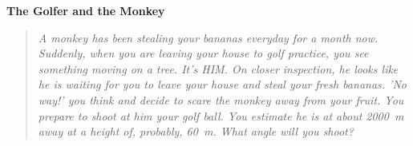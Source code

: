 \documentclass[12pt,letterpaper]{article}
\begin{document}
\begin{center}
    \Large{\textbf{The Golfer and the Monkey}}
\end{center}

\begin{quote}
\textit{A monkey has been stealing your bananas everyday for a month now. Suddenly, when you are leaving your house to golf practice, you see something moving on a tree. It's HIM. On closer inspection, he looks like he is waiting for you to leave your house and steal your fresh bananas. 'No way!' you think and decide to scare the monkey away from your fruit. You prepare to shoot at him your golf ball. You estimate he is at about \SI{2000}{\m} away at a height of, probably, \SI{60}{\m}. What angle will you shoot?}
\end{quote}


%
%
%
%



% 

% 

% 

% 

% 
\end{document}
